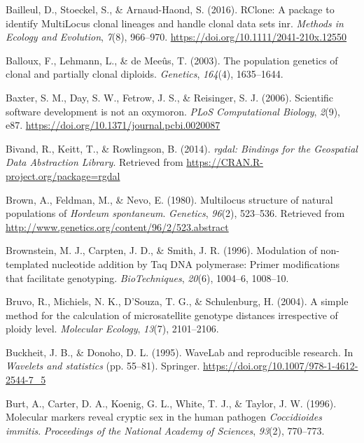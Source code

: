 \documentclass[double,11pt]{beavtex}
\begin{document}
  \hypertarget{ref-bailleul2016rclone}{}
  Bailleul, D., Stoeckel, S., \& Arnaud-Haond, S. (2016). RClone: A
  package to identify MultiLocus clonal lineages and handle clonal data
  sets inr. \emph{Methods in Ecology and Evolution}, \emph{7}(8),
  966--970. \url{https://doi.org/10.1111/2041-210x.12550}
  
  \hypertarget{ref-balloux2003population}{}
  Balloux, F., Lehmann, L., \& de Meeûs, T. (2003). The population
  genetics of clonal and partially clonal diploids. \emph{Genetics},
  \emph{164}(4), 1635--1644.
  
  \hypertarget{ref-baxter2006scientific}{}
  Baxter, S. M., Day, S. W., Fetrow, J. S., \& Reisinger, S. J. (2006).
  Scientific software development is not an oxymoron. \emph{PLoS
  Computational Biology}, \emph{2}(9), e87.
  \url{https://doi.org/10.1371/journal.pcbi.0020087}
  
  \hypertarget{ref-bivand2014rgdal}{}
  Bivand, R., Keitt, T., \& Rowlingson, B. (2014). \emph{rgdal: Bindings
  for the Geospatial Data Abstraction Library}. Retrieved from
  \url{https://CRAN.R-project.org/package=rgdal}
  
  \hypertarget{ref-brown1980multilocus}{}
  Brown, A., Feldman, M., \& Nevo, E. (1980). Multilocus structure of
  natural populations of \emph{Hordeum spontaneum}. \emph{Genetics},
  \emph{96}(2), 523--536. Retrieved from
  \url{http://www.genetics.org/content/96/2/523.abstract}
  
  \hypertarget{ref-brownstein1996modulation}{}
  Brownstein, M. J., Carpten, J. D., \& Smith, J. R. (1996). Modulation of
  non-templated nucleotide addition by Taq DNA polymerase: Primer
  modifications that facilitate genotyping. \emph{BioTechniques},
  \emph{20}(6), 1004--6, 1008--10.
  
  \hypertarget{ref-bruvo2004simple}{}
  Bruvo, R., Michiels, N. K., D'Souza, T. G., \& Schulenburg, H. (2004). A
  simple method for the calculation of microsatellite genotype distances
  irrespective of ploidy level. \emph{Molecular Ecology}, \emph{13}(7),
  2101--2106.
  
  \hypertarget{ref-buckheit1995wavelab}{}
  Buckheit, J. B., \& Donoho, D. L. (1995). WaveLab and reproducible
  research. In \emph{Wavelets and statistics} (pp. 55--81). Springer.
  \url{https://doi.org/10.1007/978-1-4612-2544-7_5}
  
  \hypertarget{ref-burt1996molecular}{}
  Burt, A., Carter, D. A., Koenig, G. L., White, T. J., \& Taylor, J. W.
  (1996). Molecular markers reveal cryptic sex in the human pathogen
  \emph{Coccidioides immitis}. \emph{Proceedings of the National Academy
  of Sciences}, \emph{93}(2), 770--773.
  
\end{document}
